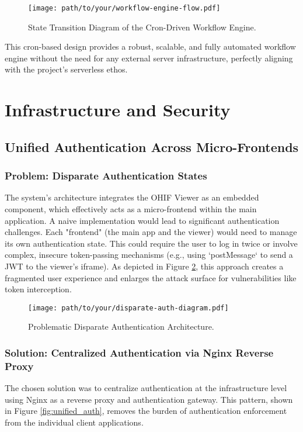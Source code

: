 \begin{figure}[h]
    \centering
    \texttt{[image: path/to/your/workflow-engine-flow.pdf]}
    \caption{State Transition Diagram of the Cron-Driven Workflow Engine.}
    \label{fig:workflow_engine_flow}
\end{figure}

This cron-based design provides a robust, scalable, and fully automated workflow engine without the need for any external server infrastructure, perfectly aligning with the project's serverless ethos.

\section{Infrastructure and Security}
\label{sec:infrastructure_security}

\subsection{Unified Authentication Across Micro-Frontends}
\label{subsec:unified_authentication}

\subsubsection{Problem: Disparate Authentication States}
The system's architecture integrates the OHIF Viewer as an embedded component, which effectively acts as a micro-frontend within the main application. A naive implementation would lead to significant authentication challenges. Each "frontend" (the main app and the viewer) would need to manage its own authentication state. This could require the user to log in twice or involve complex, insecure token-passing mechanisms (e.g., using `postMessage` to send a JWT to the viewer's iframe). As depicted in Figure \ref{fig:disparate_auth}, this approach creates a fragmented user experience and enlarges the attack surface for vulnerabilities like token interception.

\begin{figure}[h]
    \centering
    \texttt{[image: path/to/your/disparate-auth-diagram.pdf]}
    \caption{Problematic Disparate Authentication Architecture.}
    \label{fig:disparate_auth}
\end{figure}

\subsubsection{Solution: Centralized Authentication via Nginx Reverse Proxy}
The chosen solution was to centralize authentication at the infrastructure level using Nginx as a reverse proxy and authentication gateway. This pattern, shown in Figure \ref{fig:unified_auth}, removes the burden of authentication enforcement from the individual client applications.

